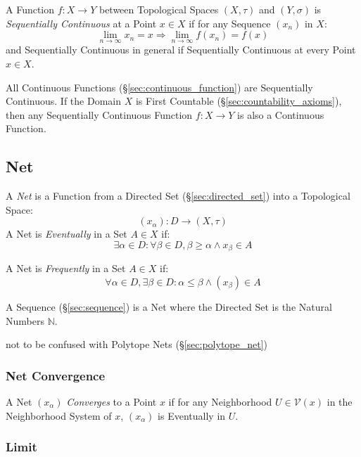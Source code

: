 A Function $f : X \rightarrow Y$ between Topological Spaces $(X,
\tau)$ and $(Y, \sigma)$ is \emph{Sequentially Continuous} at a Point
$x \in X$ if for any Sequence $(x_n)$ in $X$:
\[
  \lim_{n \rightarrow \infty} x_n = x
  \Rightarrow \lim_{n \rightarrow \infty} f(x_n) = f(x)
\]
and Sequentially Continuous in general if Sequentially Continuous at
every Point $x \in X$.

All Continuous Functions (\S\ref{sec:continuous_function}) are
Sequentially Continuous. If the Domain $X$ is First Countable
(\S\ref{sec:countability_axioms}), then any Sequentially Continuous
Function $f : X \rightarrow Y$ is also a Continuous Function.



\subsection{Net}\label{sec:net}

A \emph{Net} is a Function from a Directed Set (\S\ref{sec:directed_set}) into
a Topological Space:
\[
  (x_\alpha) : D \rightarrow (X, \tau)
\]
A Net is \emph{Eventually} in a Set $A \in X$ if:
\[
  \exists \alpha \in D
  : \forall \beta \in D, \beta \geq \alpha \wedge x_\beta \in A
\]

A Net is \emph{Frequently} in a Set $A \in X$ if:
\[
  \forall \alpha \in D, \exists \beta \in D
  : \alpha \leq \beta \wedge (x_\beta) \in A
\]

A Sequence (\S\ref{sec:sequence}) is a Net where the Directed Set is the
Natural Numbers $\mathbb{N}$.

\fist not to be confused with Polytope Nets (\S\ref{sec:polytope_net})



\subsubsection{Net Convergence}\label{sec:net_convergence}

A Net $(x_\alpha)$ \emph{Converges} to a Point $x$ if for any
Neighborhood $U \in \mathcal{V}(x)$ in the Neighborhood System of $x$,
$(x_\alpha)$ is Eventually in $U$.



\subsubsection{Limit}\label{sec:net_limit}

